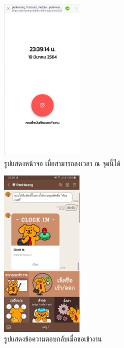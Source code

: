 \begin{figure}
  \begin{center}
    \includegraphics[width=4cm,keepaspectratio]{./images/clock.jpg}
  \end{center}
  \caption[รูปแสดงหน้าจอ เมื่อสามารถลงเวลา ณ จุดนี้ได้]{รูปแสดงหน้าจอ เมื่อสามารถลงเวลา ณ จุดนี้ได้} 
  \label{fig:clock}
\end{figure}

\begin{figure}
  \begin{center}
    \includegraphics[width=4cm,keepaspectratio]{./images/clock_in.jpg}
  \end{center}
  \caption[รูปแสดงข้อความตอบกลับเมื่อขอเข้างาน]{รูปแสดงข้อความตอบกลับเมื่อขอเข้างาน} 
  \label{fig:clock_in}
\end{figure}
 
